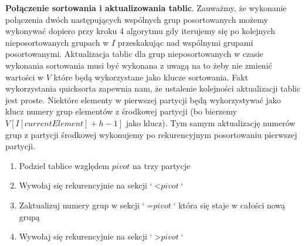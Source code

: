 \documentclass[12pt]{article}
\begin{document}
\textbf{Połączenie sortowania i aktualizowania tablic}. Zauważmy, że wykonanie połączenia dwóch następujących wspólnych grup posortowanych możemy wykonywać dopiero przy kroku 4 algorytmu gdy iterujemy się po kolejnych nieposortowanych grupach w $I$ przeskakując nad wspólnymi grupami posortowanymi. Aktualizacja tablic dla grup nieposortowanych w czasie wykonania sortowania musi być wykonana z uwagą na to żeby nie zmienić wartości w $V$ które będą wykorzystane jako klucze sortowania. Fakt wykorzystania quicksorta zapewnia nam, że ustalenie kolejności aktualizacji tablic jest proste. Niektóre elementy w pierwszej partycji będą wykorzystywać jako klucz numery grup elementów z środkowej partycji (bo bierzemy $V[I[currentElement] + h - 1]$ jako klucz). Tym samym aktualizację numerów grup z partycji środkowej wykonujemy po rekurencyjnym posortowaniu pierwszej partycji.
\begin{enumerate}
    \item Podziel tablice względem $pivot$ na trzy partycje
    \item Wywołaj się rekurencyjnie na sekcji `$< \textit{pivot}$`
    \item Zaktualizuj numery grup w sekcji `$= \textit{pivot}$` która się staje w całości nową grupą
    \item Wywołaj się rekurencyjnie na sekcji `$> \textit{pivot}$`
\end{enumerate}
\medskip

\printbibliography[title={Bibliografia}]
\end{document}
